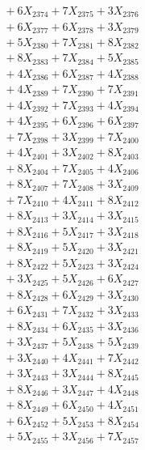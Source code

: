 \documentclass[a4paper,10pt]{article}
\begin{document}
{\begin{align}
&\;  + 6 X_{2374} + 7 X_{2375} + 3 X_{2376} \\[0.3ex]
&\;  + 6 X_{2377} + 6 X_{2378} + 3 X_{2379} \\[0.5ex]\allowbreak
&\;  + 5 X_{2380} + 7 X_{2381} + 8 X_{2382} \\[0.3ex]
&\;  + 8 X_{2383} + 7 X_{2384} + 5 X_{2385} \\[0.3ex]
&\;  + 4 X_{2386} + 6 X_{2387} + 4 X_{2388} \\[0.3ex]
&\;  + 4 X_{2389} + 7 X_{2390} + 7 X_{2391} \\[0.3ex]
&\;  + 4 X_{2392} + 7 X_{2393} + 4 X_{2394} \\[0.3ex]
&\;  + 4 X_{2395} + 6 X_{2396} + 6 X_{2397} \\[0.3ex]
&\;  + 7 X_{2398} + 3 X_{2399} + 7 X_{2400} \\[0.3ex]
&\;  + 4 X_{2401} + 3 X_{2402} + 8 X_{2403} \\[0.3ex]
&\;  + 8 X_{2404} + 7 X_{2405} + 4 X_{2406} \\[0.3ex]
&\;  + 8 X_{2407} + 7 X_{2408} + 3 X_{2409} \\[0.5ex]\allowbreak
&\;  + 7 X_{2410} + 4 X_{2411} + 8 X_{2412} \\[0.3ex]
&\;  + 8 X_{2413} + 3 X_{2414} + 3 X_{2415} \\[0.3ex]
&\;  + 8 X_{2416} + 5 X_{2417} + 3 X_{2418} \\[0.3ex]
&\;  + 8 X_{2419} + 5 X_{2420} + 3 X_{2421} \\[0.3ex]
&\;  + 8 X_{2422} + 5 X_{2423} + 3 X_{2424} \\[0.3ex]
&\;  + 3 X_{2425} + 5 X_{2426} + 6 X_{2427} \\[0.3ex]
&\;  + 8 X_{2428} + 6 X_{2429} + 3 X_{2430} \\[0.3ex]
&\;  + 6 X_{2431} + 7 X_{2432} + 3 X_{2433} \\[0.3ex]
&\;  + 8 X_{2434} + 6 X_{2435} + 3 X_{2436} \\[0.3ex]
&\;  + 3 X_{2437} + 5 X_{2438} + 5 X_{2439} \\[0.5ex]\allowbreak
&\;  + 3 X_{2440} + 4 X_{2441} + 7 X_{2442} \\[0.3ex]
&\;  + 3 X_{2443} + 3 X_{2444} + 8 X_{2445} \\[0.3ex]
&\;  + 8 X_{2446} + 3 X_{2447} + 4 X_{2448} \\[0.3ex]
&\;  + 8 X_{2449} + 6 X_{2450} + 4 X_{2451} \\[0.3ex]
&\;  + 6 X_{2452} + 5 X_{2453} + 8 X_{2454} \\[0.3ex]
&\;  + 5 X_{2455} + 3 X_{2456} + 7 X_{2457} \\[0.3ex]

\end{align}}
\end{document}
